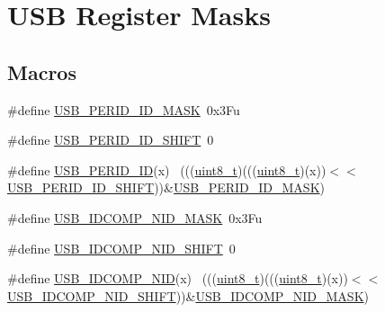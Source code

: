 \hypertarget{group___u_s_b___register___masks}{}\section{U\+SB Register Masks}
\label{group___u_s_b___register___masks}
\subsection*{Macros}
\begin{DoxyCompactItemize}
\item 
\#define \hyperlink{group___u_s_b___register___masks_ga7c4ef4c7ba738b9ec7ee90c6c482c1e5}{U\+S\+B\+\_\+\+P\+E\+R\+I\+D\+\_\+\+I\+D\+\_\+\+M\+A\+SK}~0x3\+Fu
\item 
\#define \hyperlink{group___u_s_b___register___masks_ga15b2af97cadcb108b2489e2d29e8957e}{U\+S\+B\+\_\+\+P\+E\+R\+I\+D\+\_\+\+I\+D\+\_\+\+S\+H\+I\+FT}~0
\item 
\#define \hyperlink{group___u_s_b___register___masks_ga9866908546596794c6ec34ce8e7ee9ab}{U\+S\+B\+\_\+\+P\+E\+R\+I\+D\+\_\+\+ID}(x)                                                ~(((\hyperlink{_p_e___types_8h_aba7bc1797add20fe3efdf37ced1182c5}{uint8\+\_\+t})(((\hyperlink{_p_e___types_8h_aba7bc1797add20fe3efdf37ced1182c5}{uint8\+\_\+t})(x))$<$$<$\hyperlink{group___u_s_b___register___masks_ga15b2af97cadcb108b2489e2d29e8957e}{U\+S\+B\+\_\+\+P\+E\+R\+I\+D\+\_\+\+I\+D\+\_\+\+S\+H\+I\+FT}))\&\hyperlink{group___u_s_b___register___masks_ga7c4ef4c7ba738b9ec7ee90c6c482c1e5}{U\+S\+B\+\_\+\+P\+E\+R\+I\+D\+\_\+\+I\+D\+\_\+\+M\+A\+SK})
\item 
\#define \hyperlink{group___u_s_b___register___masks_ga91e5cef0c6203ea503c01ecb0f392819}{U\+S\+B\+\_\+\+I\+D\+C\+O\+M\+P\+\_\+\+N\+I\+D\+\_\+\+M\+A\+SK}~0x3\+Fu
\item 
\#define \hyperlink{group___u_s_b___register___masks_gabb5fe5f72dcf289ba2d624ed18f8f07a}{U\+S\+B\+\_\+\+I\+D\+C\+O\+M\+P\+\_\+\+N\+I\+D\+\_\+\+S\+H\+I\+FT}~0
\item 
\#define \hyperlink{group___u_s_b___register___masks_ga45629f99413060a8de87dd44e42f4f31}{U\+S\+B\+\_\+\+I\+D\+C\+O\+M\+P\+\_\+\+N\+ID}(x)                                            ~(((\hyperlink{_p_e___types_8h_aba7bc1797add20fe3efdf37ced1182c5}{uint8\+\_\+t})(((\hyperlink{_p_e___types_8h_aba7bc1797add20fe3efdf37ced1182c5}{uint8\+\_\+t})(x))$<$$<$\hyperlink{group___u_s_b___register___masks_gabb5fe5f72dcf289ba2d624ed18f8f07a}{U\+S\+B\+\_\+\+I\+D\+C\+O\+M\+P\+\_\+\+N\+I\+D\+\_\+\+S\+H\+I\+FT}))\&\hyperlink{group___u_s_b___register___masks_ga91e5cef0c6203ea503c01ecb0f392819}{U\+S\+B\+\_\+\+I\+D\+C\+O\+M\+P\+\_\+\+N\+I\+D\+\_\+\+M\+A\+SK})

\end{DoxyCompactItemize}
